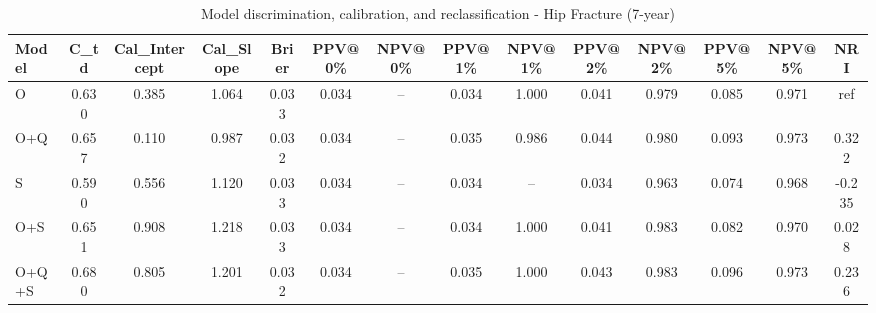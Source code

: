 \begin{table}[htbp]
\centering
\small
\caption{Model discrimination, calibration, and reclassification - Hip Fracture (7-year)}
\label{tab:perf_pd_7y}
\begin{tabular}{lccccccccccccc}
\toprule
Model & C\_td & Cal\_Intercept & Cal\_Slope & Brier & PPV@0\% & NPV@0\% & PPV@1\% & NPV@1\% & PPV@2\% & NPV@2\% & PPV@5\% & NPV@5\% & NRI \\
\midrule
O & 0.630 & 0.385 & 1.064 & 0.033 & 0.034 & -- & 0.034 & 1.000 & 0.041 & 0.979 & 0.085 & 0.971 & ref \\
O+Q & 0.657 & 0.110 & 0.987 & 0.032 & 0.034 & -- & 0.035 & 0.986 & 0.044 & 0.980 & 0.093 & 0.973 & 0.322 \\
S & 0.590 & 0.556 & 1.120 & 0.033 & 0.034 & -- & 0.034 & -- & 0.034 & 0.963 & 0.074 & 0.968 & -0.235 \\
O+S & 0.651 & 0.908 & 1.218 & 0.033 & 0.034 & -- & 0.034 & 1.000 & 0.041 & 0.983 & 0.082 & 0.970 & 0.028 \\
O+Q+S & 0.680 & 0.805 & 1.201 & 0.032 & 0.034 & -- & 0.035 & 1.000 & 0.043 & 0.983 & 0.096 & 0.973 & 0.236 \\
\bottomrule
\end{tabular}
\end{table}